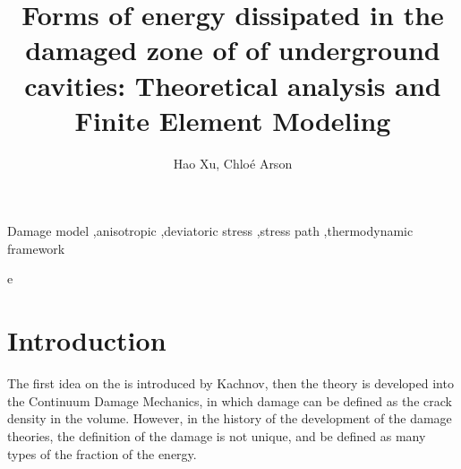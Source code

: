 \documentclass[preprint,review,12pt]{elsarticle}
\begin{document}
\begin{frontmatter}



\title{Forms of energy dissipated in the damaged zone of of underground cavities: Theoretical analysis and Finite Element Modeling}


\author{Hao Xu, Chlo\'e Arson}

\address{School of Civil and Environmental Engineering,
Georgia Institute of Technology, Atlanta, Georgia 30332, U.S.A.}

\begin{abstract}


\end{abstract}

\begin{keyword}
Damage model \sep anisotropic \sep deviatoric stress \sep stress path
\sep thermodynamic framework

e\end{keyword}

\end{frontmatter}



\section{Introduction}
%
The first idea on the is introduced by Kachnov, then the theory is developed into the Continuum Damage Mechanics, in which damage can be defined as the crack density in the volume. However, in the history of the development of the damage theories, the definition of the damage is not unique, and be defined as many types of the fraction of the energy. 
\end{document}
